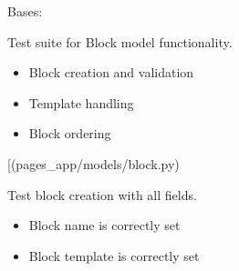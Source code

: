 \documentclass[letterpaper,10pt,english]{sphinxmanual}
\begin{document}
\begin{fulllineitems}
\label{\detokenize{pages_app.tests:pages_app.tests.test_models.BlockModelTest}}
\pysigstartsignatures
\pysiglinewithargsret
{}
{}
{}
\pysigstopsignatures
\sphinxAtStartPar
Bases: 

\sphinxAtStartPar
Test suite for Block model functionality.
\begin{description}
\begin{itemize}
\item {} 
\sphinxAtStartPar
Block creation and validation

\item {} 
\sphinxAtStartPar
Template handling

\item {} 
\sphinxAtStartPar
Block ordering

\end{itemize}

\sphinxAtStartPar
{[}\sphinxtitleref{Block}{]}(pages\_app/models/block.py)

\end{description}

\begin{fulllineitems}
\label{\detokenize{pages_app.tests:pages_app.tests.test_models.BlockModelTest.test_block_creation}}
\pysigstartsignatures
\pysiglinewithargsret
{}
{}
{}
\pysigstopsignatures
\sphinxAtStartPar
Test block creation with all fields.
\begin{description}
\begin{itemize}
\item {} 
\sphinxAtStartPar
Block name is correctly set

\item {} 
\sphinxAtStartPar
Block template is correctly set

\end{itemize}

\end{description}


\end{fulllineitems}
\end{fulllineitems}
\end{document}
